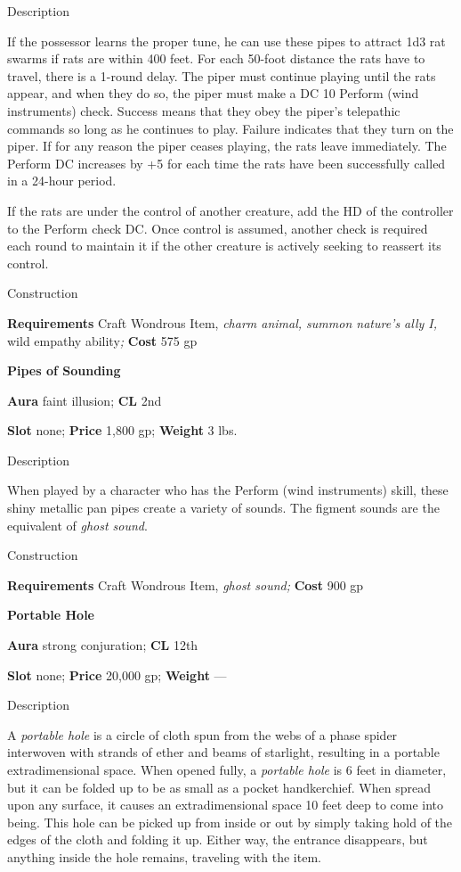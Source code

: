 Description
				
If the possessor learns the proper tune, he can use these pipes to attract 1d3 rat swarms if rats are within 400 feet. For each 50-foot distance the rats have to travel, there is a 1-round delay. The piper must continue playing until the rats appear, and when they do so, the piper must make a DC 10 Perform (wind instruments) check. Success means that they obey the piper's telepathic commands so long as he continues to play. Failure indicates that they turn on the piper. If for any reason the piper ceases playing, the rats leave immediately. The Perform DC increases by +5 for each time the rats have been successfully called in a 24-hour period.
				
If the rats are under the control of another creature, add the HD of the controller to the Perform check DC. Once control is assumed, another check is required each round to maintain it if the other creature is actively seeking to reassert its control. 
				
Construction
				
\textbf{Requirements} Craft Wondrous Item,\textit{ charm animal, summon nature's ally I, }wild empathy ability\textit{;}\textbf{ Cost }575 gp
				
\textbf{Pipes of Sounding}
				
\textbf{Aura} faint illusion;\textbf{ CL }2nd
				
\textbf{Slot} none; \textbf{Price} 1,800 gp; \textbf{Weight} 3 lbs.
				
Description
				
When played by a character who has the Perform (wind instruments) skill, these shiny metallic pan pipes create a variety of sounds. The figment sounds are the equivalent of \textit{ghost sound}. 
				
Construction
				
\textbf{Requirements} Craft Wondrous Item,\textit{ ghost sound;}\textbf{ Cost }900 gp
				
\textbf{Portable Hole}
				
\textbf{Aura} strong conjuration;\textbf{ CL }12th
				
\textbf{Slot} none; \textbf{Price} 20,000 gp; \textbf{Weight }---
				
Description
				
A \textit{portable hole} is a circle of cloth spun from the webs of a phase spider interwoven with strands of ether and beams of starlight, resulting in a portable extradimensional space. When opened fully, a \textit{portable hole} is 6 feet in diameter, but it can be folded up to be as small as a pocket handkerchief. When spread upon any surface, it causes an extradimensional space 10 feet deep to come into being. This hole can be picked up from inside or out by simply taking hold of the edges of the cloth and folding it up. Either way, the entrance disappears, but anything inside the hole remains, traveling with the item.
				
